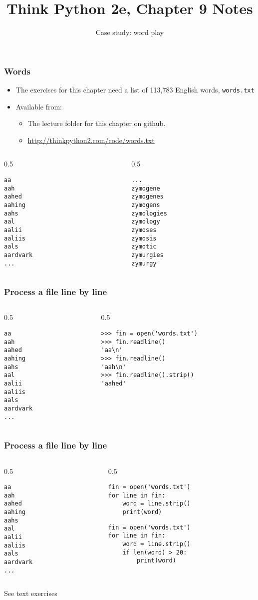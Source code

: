 \documentclass{beamer}
\title{Think Python 2e, Chapter 9 Notes}
\author{Case study: word play}
\newcommand{\bi}{\begin{itemize}}
\newcommand{\li}{\item}
\newcommand{\ei}{\end{itemize}}
\newcommand{\bfr}[1]{\begin{frame}[fragile]\frametitle{{ #1 }}}
\newcommand{\cola}{\begin{columns}\begin{column}{0.5\textwidth}}
\newcommand{\colb}{\end{column}\begin{column}{0.5\textwidth}}
\newcommand{\colc}{\end{column}\end{columns}}
\begin{document}
\begin{frame}
\maketitle
\end{frame}

\bfr{Words}
\bi
\li The exercises for this chapter need a list of 113,783 English words, {\tt words.txt}
\li Available from:
\bi
\li The lecture folder for this chapter on github.
\li \url{http://thinkpython2.com/code/words.txt}
\ei
\ei
\cola
\begin{lstlisting}
aa
aah
aahed
aahing
aahs
aal
aalii
aaliis
aals
aardvark
...
\end{lstlisting}
\colb
\begin{lstlisting}
...
zymogene
zymogenes
zymogens
zymologies
zymology
zymoses
zymosis
zymotic
zymurgies
zymurgy
\end{lstlisting}
\colc

\end{frame}

\bfr{Process a file line by line}

\cola
\begin{lstlisting}
aa
aah
aahed
aahing
aahs
aal
aalii
aaliis
aals
aardvark
...
\end{lstlisting}
\colb
\begin{lstlisting}
>>> fin = open('words.txt')
>>> fin.readline()
'aa\n'
>>> fin.readline()
'aah\n'
>>> fin.readline().strip()
'aahed'
\end{lstlisting}
\colc
\end{frame}

\bfr{Process a file line by line}

\cola
\begin{lstlisting}
aa
aah
aahed
aahing
aahs
aal
aalii
aaliis
aals
aardvark
...
\end{lstlisting}
\colb
\begin{lstlisting}
fin = open('words.txt')
for line in fin:
    word = line.strip()
    print(word)
\end{lstlisting}
\pause
\begin{lstlisting}
fin = open('words.txt')
for line in fin:
    word = line.strip()
    if len(word) > 20:
        print(word)
\end{lstlisting}
\colc
\pause
\begin{center}
See text exercises
\end{center}

\end{frame}
\end{document}
